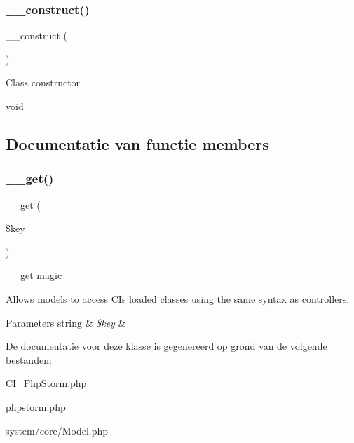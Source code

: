 \subsubsection{\texorpdfstring{\_\_construct()}{\_\_construct()}}
{\footnotesize\ttfamily \+\_\+\+\_\+construct (\begin{DoxyParamCaption}{ }\end{DoxyParamCaption})}

Class constructor

\mbox{\hyperlink{}{void }}

\subsection{Documentatie van functie members}
\mbox{\label{class_c_i___model_a4537dad3b44254124991341cc91b28fb}} 
\subsubsection{\texorpdfstring{\_\_get()}{\_\_get()}}
{\footnotesize\ttfamily \+\_\+\+\_\+get (\begin{DoxyParamCaption}\item[{}]{\$key }\end{DoxyParamCaption})}

\+\_\+\+\_\+get magic

Allows models to access CI\textquotesingle{}s loaded classes using the same syntax as controllers.


\begin{DoxyParams}[1]{Parameters}
string & {\em \$key} & \\
\hline
\end{DoxyParams}


De documentatie voor deze klasse is gegenereerd op grond van de volgende bestanden\+:\begin{DoxyCompactItemize}
\item 
C\+I\+\_\+\+Php\+Storm.\+php\item 
phpstorm.\+php\item 
system/core/Model.\+php\end{DoxyCompactItemize}
